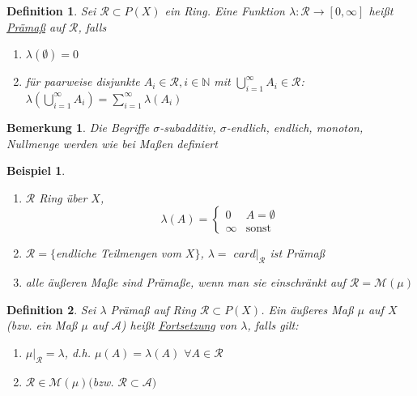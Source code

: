 \documentclass[11pt]{memoir}
\theoremstyle{changebreak}
\newtheorem{Definition}{Definition}[chapter]
\newtheorem{Bemerkung}{Bemerkung}[chapter]
\newtheorem{Beispiel}{Beispiel}[chapter]
\begin{document}
\begin{Definition}
Sei $\mathscr R \subset P(X)$ ein Ring. Eine Funktion $\lambda: \mathscr R \rightarrow [0, \infty]$ heißt \underline{Prämaß} auf $\mathscr R$, falls
\begin{enumerate}
	\item $\lambda(\emptyset) = 0$
	\item für paarweise disjunkte $A_i \in \mathscr R, i \in \mathbb N$ mit $\bigcup\limits_{i=1}^\infty A_i \in \mathscr R$: \\
	$\lambda \left(\bigcup\limits_{i=1}^\infty A_i\right) = \sum\limits_{i=1}^\infty \lambda(A_i)$
\end{enumerate}
\end{Definition}

\begin{Bemerkung}
Die Begriffe $\sigma$-subadditiv, $\sigma$-endlich, endlich, monoton, Nullmenge werden wie bei Maßen definiert
\end{Bemerkung}

\begin{Beispiel}
\begin{enumerate}
	\item $\mathscr R$ Ring über $X$,
	\begin{equation}
	\lambda(A) =
		\begin{cases}
			0 & A = \emptyset \\
			\infty & \text{sonst}
		\end{cases}
	\end{equation}
	\item $\mathscr R = \{$endliche Teilmengen vom $X\}$, $\lambda = $ $card|_{\mathscr R}$ ist Prämaß
	\item alle äußeren Maße sind Prämaße, wenn man sie einschränkt auf $\mathscr R = \mathscr M(\mu)$
\end{enumerate}
\end{Beispiel}

\begin{Definition}
Sei $\lambda$ Prämaß auf Ring $\mathscr R \subset P(X)$. Ein äußeres Maß $\mu$ auf $X$ (bzw. ein Maß $\mu$ auf $\mathscr A$) heißt \underline{Fortsetzung} von $\lambda$, falls gilt:
\begin{enumerate}
	\item $\mu|_\mathscr R = \lambda$, d.h. $\mu(A) = \lambda(A)$ $\forall A \in \mathscr R$
	\item $\mathscr R \in \mathscr M(\mu) ($bzw. $\mathscr R \subset \mathscr A)$
\end{enumerate}
\end{Definition}
\end{document}
